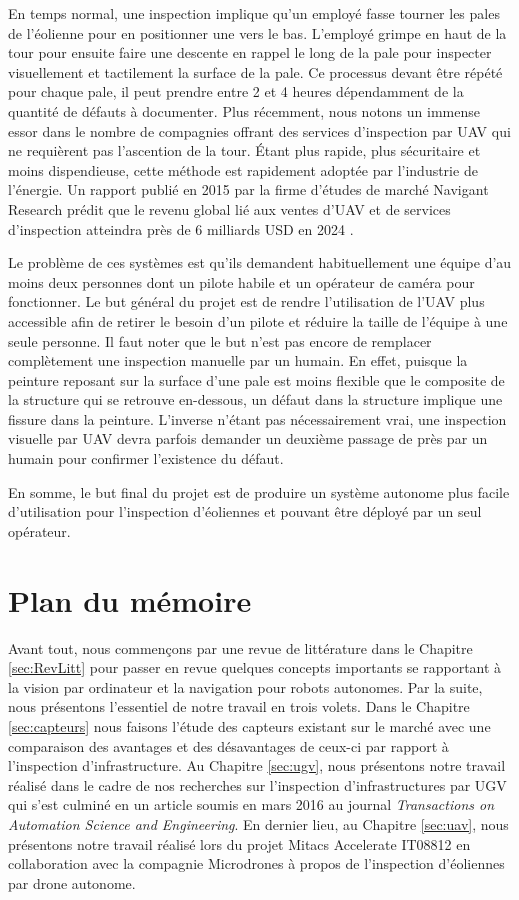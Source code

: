 En temps normal, une inspection implique qu'un employé fasse tourner les pales de l'éolienne pour en positionner une vers le bas. L'employé grimpe en haut de la tour pour ensuite faire une descente en rappel le long de la pale pour inspecter visuellement et tactilement la surface de la pale. Ce processus devant être répété pour chaque pale, il peut prendre entre 2 et 4 heures dépendamment de la quantité de défauts à documenter. Plus récemment, nous notons un immense essor dans le nombre de compagnies offrant des services d'inspection par UAV qui ne requièrent pas l'ascention de la tour. Étant plus rapide, plus sécuritaire et moins dispendieuse, cette méthode est rapidement adoptée par l'industrie de l'énergie. Un rapport publié en 2015 par la firme d'études de marché Navigant Research prédit que le revenu global lié aux ventes d'UAV et de services d'inspection atteindra près de 6 milliards USD en 2024 \citep{navigant2015}.

Le problème de ces systèmes est qu'ils demandent habituellement une équipe d'au moins deux personnes dont un pilote habile et un opérateur de caméra pour fonctionner. Le but général du projet est de rendre l'utilisation de l'UAV plus accessible afin de retirer le besoin d'un pilote et réduire la taille de l'équipe à une seule personne. Il faut noter que le but n'est pas encore de remplacer complètement une inspection manuelle par un humain. En effet, puisque la peinture reposant sur la surface d'une pale est moins flexible que le composite de la structure qui se retrouve en-dessous, un défaut dans la structure implique une fissure dans la peinture. L'inverse n'étant pas nécessairement vrai, une inspection visuelle par UAV devra parfois demander un deuxième passage de près par un humain pour confirmer l'existence du défaut.

En somme, le but final du projet est de produire un système autonome plus facile d'utilisation pour l'inspection d'éoliennes et pouvant être déployé par un seul opérateur.

\section{Plan du mémoire}

Avant tout, nous commençons par une revue de littérature dans le Chapitre \ref{sec:RevLitt} pour passer en revue quelques concepts importants se rapportant à la vision par ordinateur et la navigation pour robots autonomes. Par la suite, nous présentons l'essentiel de notre travail en trois volets. Dans le Chapitre \ref{sec:capteurs} nous faisons l'étude des capteurs existant sur le marché avec une comparaison des avantages et des désavantages de ceux-ci par rapport à l'inspection d'infrastructure. Au Chapitre \ref{sec:ugv}, nous présentons notre travail réalisé dans le cadre de nos recherches sur l'inspection d'infrastructures par UGV qui s'est culminé en un article soumis en mars 2016 au journal \textit{Transactions on Automation Science and Engineering}. En dernier lieu, au Chapitre \ref{sec:uav}, nous présentons notre travail réalisé lors du projet Mitacs Accelerate IT08812 en collaboration avec la compagnie Microdrones à propos de l'inspection d'éoliennes par drone autonome.


